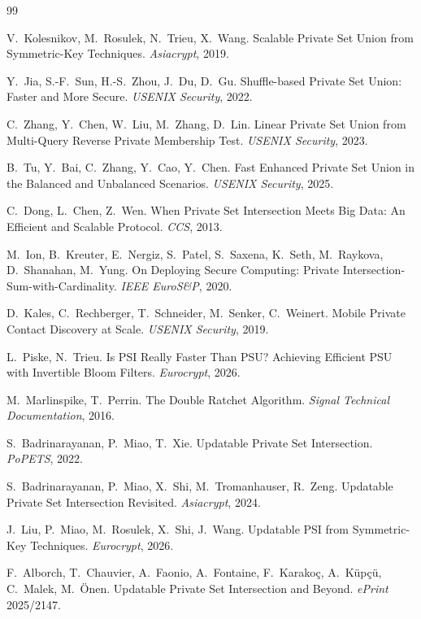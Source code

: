 \begin{thebibliography}{99}

 V.~Kolesnikov, M.~Rosulek, N.~Trieu, X.~Wang.
\newblock Scalable Private Set Union from Symmetric-Key Techniques. \emph{Asiacrypt}, 2019.

 Y.~Jia, S.-F.~Sun, H.-S.~Zhou, J.~Du, D.~Gu.
\newblock Shuffle-based Private Set Union: Faster and More Secure. \emph{USENIX Security}, 2022.

 C.~Zhang, Y.~Chen, W.~Liu, M.~Zhang, D.~Lin.
\newblock Linear Private Set Union from Multi-Query Reverse Private Membership Test. \emph{USENIX Security}, 2023.

 B.~Tu, Y.~Bai, C.~Zhang, Y.~Cao, Y.~Chen.
\newblock Fast Enhanced Private Set Union in the Balanced and Unbalanced Scenarios. \emph{USENIX Security}, 2025.

 C.~Dong, L.~Chen, Z.~Wen.
\newblock When Private Set Intersection Meets Big Data: An Efficient and Scalable Protocol. \emph{CCS}, 2013.

 M.~Ion, B.~Kreuter, E.~Nergiz, S.~Patel, S.~Saxena, K.~Seth,
M.~Raykova, D.~Shanahan, M.~Yung.
\newblock On Deploying Secure Computing: Private Intersection-Sum-with-Cardinality. \emph{IEEE EuroS\&P}, 2020.

 D.~Kales, C.~Rechberger, T.~Schneider, M.~Senker, C.~Weinert.
\newblock Mobile Private Contact Discovery at Scale. \emph{USENIX Security}, 2019.

 L.~Piske, N.~Trieu.
\newblock Is PSI Really Faster Than PSU? Achieving Efficient PSU with Invertible Bloom Filters. \emph{Eurocrypt}, 2026.

 M.~Marlinspike, T.~Perrin.
\newblock The Double Ratchet Algorithm. \emph{Signal Technical Documentation}, 2016.

 S.~Badrinarayanan, P.~Miao, T.~Xie.
\newblock Updatable Private Set Intersection. \emph{PoPETS}, 2022.

 S.~Badrinarayanan, P.~Miao, X.~Shi, M.~Tromanhauser, R.~Zeng.
\newblock Updatable Private Set Intersection Revisited. \emph{Asiacrypt}, 2024.

 J.~Liu, P.~Miao, M.~Rosulek, X.~Shi, J.~Wang.
\newblock Updatable PSI from Symmetric-Key Techniques. \emph{Eurocrypt}, 2026.

 F.~Alborch, T.~Chauvier, A.~Faonio, A.~Fontaine, F.~Karako\c{c},
A.~K\"{u}p\c{c}\"{u}, C.~Malek, M.~\"{O}nen.
\newblock Updatable Private Set Intersection and Beyond. \emph{ePrint} 2025/2147.


\end{thebibliography}
